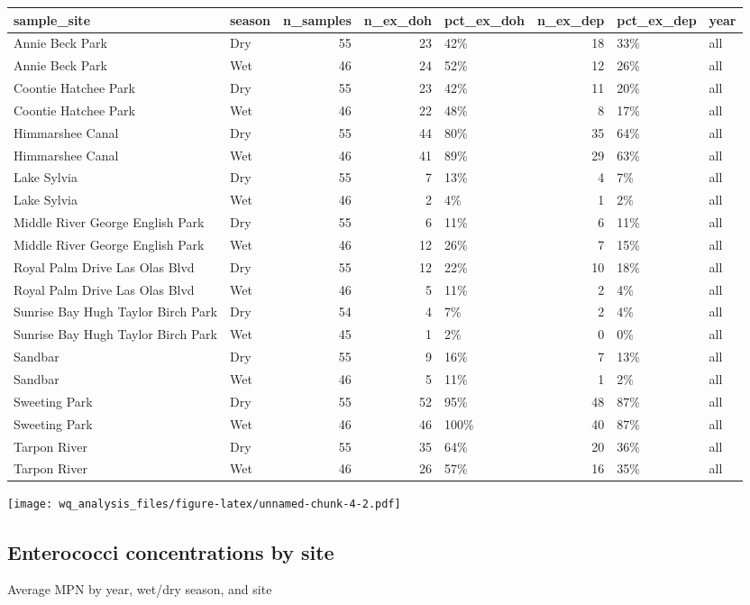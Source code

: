 \documentclass[
]{article}
\begin{document}
\begin{longtable}[]{@{}llrrlrll@{}}
\toprule
sample\_site & season & n\_samples & n\_ex\_doh & pct\_ex\_doh &
n\_ex\_dep & pct\_ex\_dep & year\tabularnewline
\midrule
\endhead
Annie Beck Park & Dry & 55 & 23 & 42\% & 18 & 33\% & all\tabularnewline
Annie Beck Park & Wet & 46 & 24 & 52\% & 12 & 26\% & all\tabularnewline
Coontie Hatchee Park & Dry & 55 & 23 & 42\% & 11 & 20\% &
all\tabularnewline
Coontie Hatchee Park & Wet & 46 & 22 & 48\% & 8 & 17\% &
all\tabularnewline
Himmarshee Canal & Dry & 55 & 44 & 80\% & 35 & 64\% & all\tabularnewline
Himmarshee Canal & Wet & 46 & 41 & 89\% & 29 & 63\% & all\tabularnewline
Lake Sylvia & Dry & 55 & 7 & 13\% & 4 & 7\% & all\tabularnewline
Lake Sylvia & Wet & 46 & 2 & 4\% & 1 & 2\% & all\tabularnewline
Middle River George English Park & Dry & 55 & 6 & 11\% & 6 & 11\% &
all\tabularnewline
Middle River George English Park & Wet & 46 & 12 & 26\% & 7 & 15\% &
all\tabularnewline
Royal Palm Drive Las Olas Blvd & Dry & 55 & 12 & 22\% & 10 & 18\% &
all\tabularnewline
Royal Palm Drive Las Olas Blvd & Wet & 46 & 5 & 11\% & 2 & 4\% &
all\tabularnewline
Sunrise Bay Hugh Taylor Birch Park & Dry & 54 & 4 & 7\% & 2 & 4\% &
all\tabularnewline
Sunrise Bay Hugh Taylor Birch Park & Wet & 45 & 1 & 2\% & 0 & 0\% &
all\tabularnewline
Sandbar & Dry & 55 & 9 & 16\% & 7 & 13\% & all\tabularnewline
Sandbar & Wet & 46 & 5 & 11\% & 1 & 2\% & all\tabularnewline
Sweeting Park & Dry & 55 & 52 & 95\% & 48 & 87\% & all\tabularnewline
Sweeting Park & Wet & 46 & 46 & 100\% & 40 & 87\% & all\tabularnewline
Tarpon River & Dry & 55 & 35 & 64\% & 20 & 36\% & all\tabularnewline
Tarpon River & Wet & 46 & 26 & 57\% & 16 & 35\% & all\tabularnewline
\bottomrule
\end{longtable}

\texttt{[image: wq\_analysis\_files/figure-latex/unnamed-chunk-4-2.pdf]}

\hypertarget{enterococci-concentrations-by-site}{%
\subsection{Enterococci concentrations by
site}\label{enterococci-concentrations-by-site}}

Average MPN by year, wet/dry season, and site
\end{document}
